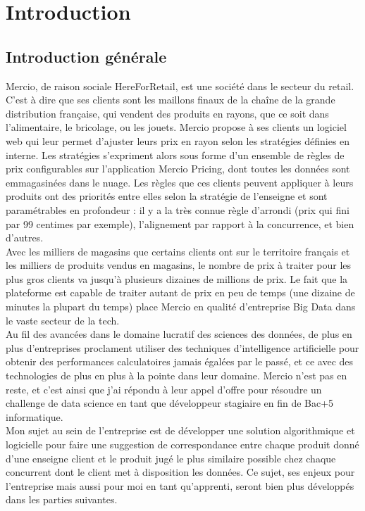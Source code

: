 \documentclass{rapportCS}
\begin{document}



\section{Introduction} 

\subsection{Introduction générale}
	Mercio, de raison sociale HereForRetail, est une société dans le secteur du retail. C'est à dire que ses clients sont les maillons finaux de la chaîne de la grande distribution française, qui vendent des produits en rayons, que ce soit dans l'alimentaire, le bricolage, ou les jouets. Mercio propose à ses clients un logiciel web qui leur permet d'ajuster leurs prix en rayon selon les stratégies définies en interne. Les stratégies s'expriment alors sous forme d'un ensemble de règles de prix configurables sur l'application Mercio Pricing, dont toutes les données sont emmagasinées dans le nuage. Les règles que ces clients peuvent appliquer à leurs produits ont des priorités entre elles selon la stratégie de l'enseigne et sont paramétrables en profondeur : il y a la très connue règle d'arrondi (prix qui fini par 99 centimes par exemple), l'alignement par rapport à la concurrence, et bien d'autres. \\
	Avec les milliers de magasins que certains clients ont sur le territoire français et les milliers de produits vendus en magasins, le nombre de prix à traiter pour les plus gros clients va jusqu'à plusieurs dizaines de millions de prix. Le fait que la plateforme est capable de traiter autant de prix en peu de temps (une dizaine de minutes la plupart du temps) place Mercio en qualité d'entreprise Big Data dans le vaste secteur de la tech.\\
	Au fil des avancées dans le domaine lucratif des sciences des données, de plus en plus d'entreprises proclament utiliser des techniques d'intelligence artificielle pour obtenir des performances calculatoires jamais égalées par le passé, et ce avec des technologies de plus en plus à la pointe dans leur domaine. Mercio n'est pas en reste, et c'est ainsi que j'ai répondu à leur appel d'offre pour résoudre un challenge de data science en tant que développeur stagiaire en fin de Bac+5 informatique.\\
	Mon sujet au sein de l'entreprise est de développer une solution algorithmique et logicielle pour faire une suggestion de correspondance entre chaque produit donné d'une enseigne client et le produit jugé le plus similaire possible chez chaque concurrent dont le client met à disposition les données. Ce sujet, ses enjeux pour l'entreprise mais aussi pour moi en tant qu'apprenti, seront bien plus développés dans les parties suivantes.\\
\end{document}
